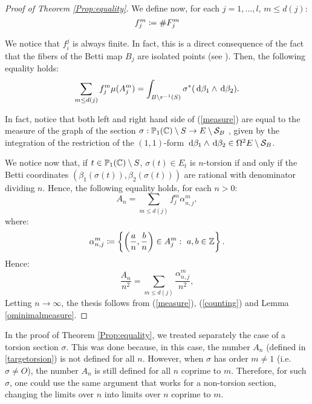 \documentclass[a4paper,12pt]{article}
\theoremstyle{remark}
\begin{document}
\begin{proof}[Proof of Theorem \ref{Prop:equality}]
	We define now, for each $j=1,\dots, l$, $m \leq d(j)$:
	\begin{equation}
		f_j^m\coloneqq \#F_j^m
	\end{equation}
	
	We notice that $f_i^j$ is always finite. In fact, this is a direct consequence of the fact that the fibers of the Betti map $B_j$ are isolated points (see \cite[Proposition 1.1]{bettitorsion}).
	Then, the following equality holds:
	\begin{equation}\label{measure}
	\sum_{m \leq d(j)} f_{j}^m\mu(A_j^m)=\int_{B\setminus r^{-1}(S)} \sigma^*(\,\mathrm d \beta_1 \wedge \,\mathrm d \beta_2).
	\end{equation}
	
	In fact, notice that both left and right hand side of (\ref{measure}) are equal to the measure of the graph of the section $\sigma:\mathbb{P}_1(\mathbb C)\setminus S\rightarrow E\setminus \mathcal{S}_B$ %
	, given by the integration of the restriction of the $(1,1)$-form $\,\mathrm d \beta_1 \wedge \,\mathrm d \beta_2 \in \Omega^2{E \setminus \mathcal{S}_B}$.
	
	We notice now that, if $t \in \mathbb{P}_1(\mathbb C)\setminus S$, $\sigma(t) \in E_t$ is $n$-torsion if and only if the Betti coordinates $(\beta_1(\sigma(t)),\beta_2(\sigma(t)))$ are rational with denominator dividing $n$. Hence, the following equality holds, for each $n>0$:
	\begin{equation}\label{counting}
		A_n=\sum_{m \leq d(j)}f_{j}^m\alpha_{n,j}^m,
	\end{equation}
	where:
	\[
	\alpha_{n,j}^m\coloneqq \left\{\left(\frac{a}{n},\frac{b}{n}\right)\in A_j^m: \ a,b \in \mathbb Z\right\}.
	\]
	Hence:
	\[
		\frac{A_n}{n^2}=\sum_{m \leq d(j)}\frac{\alpha_{n,j}^m}{n^2},
	\]
	Letting $n \to \infty$, the thesis follows from (\ref{measure}), (\ref{counting}) and Lemma \ref{ominimalmeasure}.
\end{proof}

\begin{remark}\label{Rmk:torsion}
	In the proof of Theorem \ref{Prop:equality}, we treated separately the case of a torsion section $\sigma$. This was done because, in this case, the number $A_n$ (defined in \ref{targetorsion}) is not defined for all $n$. However, when $\sigma$ has order $m \neq 1$ (i.e. $\sigma \neq O$), the number $A_n$ is still defined for all $n$ coprime to $m$. Therefore, for such $\sigma$, one could use the same argument that works for a non-torsion section, changing the limits over $n$ into limits over $n$ coprime to $m$.
\end{remark}
\end{document}
